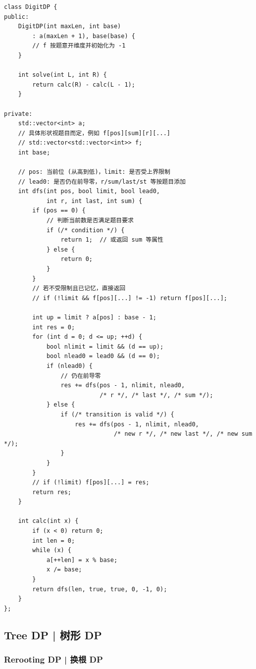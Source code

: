     \begin{lstlisting}
class DigitDP {
public:
    DigitDP(int maxLen, int base)
        : a(maxLen + 1), base(base) {
        // f 按题意开维度并初始化为 -1
    }

    int solve(int L, int R) {
        return calc(R) - calc(L - 1);
    }

private:
    std::vector<int> a;
    // 具体形状视题目而定，例如 f[pos][sum][r][...]
    // std::vector<std::vector<int>> f;
    int base;

    // pos: 当前位 (从高到低)，limit: 是否受上界限制
    // lead0: 是否仍在前导零，r/sum/last/st 等按题目添加
    int dfs(int pos, bool limit, bool lead0,
            int r, int last, int sum) {
        if (pos == 0) {
            // 判断当前数是否满足题目要求
            if (/* condition */) {
                return 1;  // 或返回 sum 等属性
            } else {
                return 0;
            }
        }
        // 若不受限制且已记忆，直接返回
        // if (!limit && f[pos][...] != -1) return f[pos][...];

        int up = limit ? a[pos] : base - 1;
        int res = 0;
        for (int d = 0; d <= up; ++d) {
            bool nlimit = limit && (d == up);
            bool nlead0 = lead0 && (d == 0);
            if (nlead0) {
                // 仍在前导零
                res += dfs(pos - 1, nlimit, nlead0,
                           /* r */, /* last */, /* sum */);
            } else {
                if (/* transition is valid */) {
                    res += dfs(pos - 1, nlimit, nlead0,
                               /* new r */, /* new last */, /* new sum */);
                }
            }
        }
        // if (!limit) f[pos][...] = res;
        return res;
    }

    int calc(int x) {
        if (x < 0) return 0;
        int len = 0;
        while (x) {
            a[++len] = x % base;
            x /= base;
        }
        return dfs(len, true, true, 0, -1, 0);
    }
};
        \end{lstlisting}

\subsection{Tree DP | 树形 DP}

    \subsubsection{Rerooting DP | 换根 DP}

